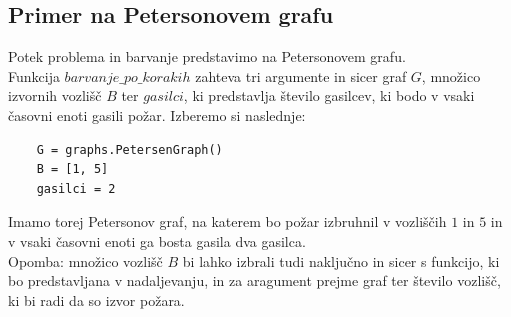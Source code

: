 \documentclass[a4paper, 12pt]{article}
\begin{document}
\subsection{Primer na Petersonovem grafu}
\noindent Potek problema in barvanje predstavimo na Petersonovem grafu. \\ 
Funkcija $barvanje\_po\_korakih$ zahteva tri argumente
in sicer graf $G$, množico izvornih vozlišč $B$ ter $gasilci$, ki predstavlja število gasilcev, ki 
bodo v vsaki časovni enoti gasili požar.
Izberemo si naslednje:
\begin{small}
\begin{verbatim}
    G = graphs.PetersenGraph()
    B = [1, 5]
    gasilci = 2
\end{verbatim}
\end{small}
Imamo torej Petersonov graf, na katerem bo požar izbruhnil v vozliščih $1$ in $5$ in v vsaki časovni enoti ga bosta
gasila dva gasilca. \\
Opomba: množico vozlišč $B$ bi lahko izbrali tudi naključno in sicer s funkcijo, ki bo predstavljana
v nadaljevanju, in za aragument prejme graf ter število vozlišč, ki bi radi da so izvor požara. \\
\end{document}
